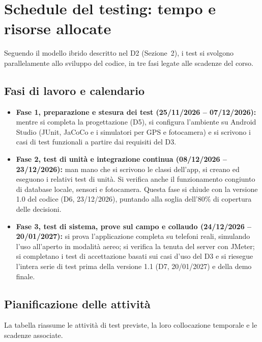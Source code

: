 \section{Schedule del testing: tempo e risorse allocate}

Seguendo il modello ibrido descritto nel D2 (Sezione~2), i test si svolgono parallelamente allo sviluppo del codice, in tre fasi legate alle scadenze del corso.

\subsection{Fasi di lavoro e calendario}

\begin{itemize}
    \item \textbf{Fase 1, preparazione e stesura dei test (25/11/2026 -- 07/12/2026):} mentre si completa la progettazione (D5), si configura l'ambiente su Android Studio (JUnit, JaCoCo e i simulatori per GPS e fotocamera) e si scrivono i casi di test funzionali a partire dai requisiti del D3.
    \item \textbf{Fase 2, test di unità e integrazione continua (08/12/2026 -- 23/12/2026):} man mano che si scrivono le classi dell'app, si creano ed eseguono i relativi test di unità. Si verifica anche il funzionamento congiunto di database locale, sensori e fotocamera. Questa fase si chiude con la versione 1.0 del codice (D6, 23/12/2026), puntando alla soglia dell'80\% di copertura delle decisioni.
    \item \textbf{Fase 3, test di sistema, prove sul campo e collaudo (24/12/2026 -- 20/01/2027):} si prova l'applicazione completa su telefoni reali, simulando l'uso all'aperto in modalità aereo; si verifica la tenuta del server con JMeter; si completano i test di accettazione basati sui casi d'uso del D3 e si riesegue l'intera serie di test prima della versione 1.1 (D7, 20/01/2027) e della demo finale.
\end{itemize}

\subsection{Pianificazione delle attività}

La tabella riassume le attività di test previste, la loro collocazione temporale e le scadenze associate.

